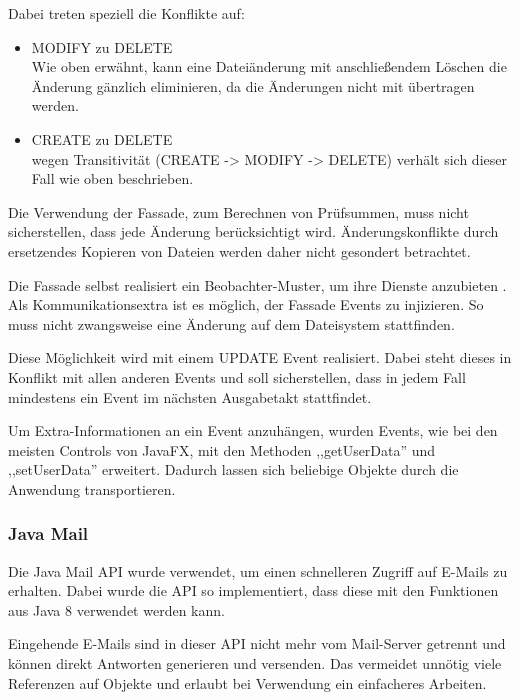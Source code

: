 \documentclass[oneside, ngerman, toc=bibliography,bibliography=totoc,listof=entryprefix, open=right,numbers=noenddot,fontsize=12pt]{scrbook}
\begin{document}
\bigskip
Dabei treten speziell die Konflikte auf:

\begin{itemize}
    \item MODIFY zu DELETE \\
    Wie oben erwähnt, kann eine Dateiänderung mit anschließendem Löschen die Änderung gänzlich eliminieren, da die Änderungen nicht mit übertragen werden.
    \item CREATE zu DELETE \\
    wegen Transitivität (CREATE -> MODIFY -> DELETE) verhält sich dieser Fall wie oben beschrieben.
\end{itemize}

Die Verwendung der Fassade, zum Berechnen von Prüfsummen, muss nicht sicherstellen, dass jede Änderung berücksichtigt wird.
Änderungskonflikte durch ersetzendes Kopieren von Dateien werden daher nicht gesondert betrachtet.

Die Fassade selbst realisiert ein Beobachter-Muster, um ihre Dienste anzubieten \cite{gamma2011entwurfsmuster}.
Als Kommunikationsextra ist es möglich, der Fassade Events zu injizieren. So muss nicht zwangsweise eine Änderung auf dem Dateisystem stattfinden.

Diese Möglichkeit wird mit einem UPDATE Event realisiert.
Dabei steht dieses in Konflikt mit allen anderen Events und soll sicherstellen, dass in jedem Fall mindestens ein Event im nächsten Ausgabetakt stattfindet.

Um Extra-Informationen an ein Event anzuhängen, wurden Events, wie bei den meisten Controls von JavaFX, mit den Methoden ,,getUserData'' und ,,setUserData'' erweitert. Dadurch lassen sich beliebige Objekte durch die Anwendung transportieren. 



\subsubsection{Java Mail}
Die Java Mail API wurde verwendet, um einen schnelleren Zugriff auf E-Mails zu erhalten. Dabei wurde die API so implementiert, dass diese mit den Funktionen aus Java 8 verwendet werden kann.

Eingehende E-Mails sind in dieser API nicht mehr vom Mail-Server getrennt und können direkt Antworten generieren und versenden. Das vermeidet unnötig viele Referenzen auf Objekte und erlaubt bei Verwendung ein einfacheres Arbeiten.
\end{document}
